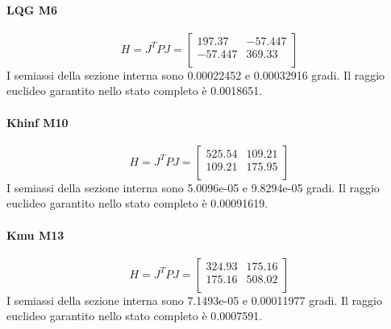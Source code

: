 \paragraph{LQG M6}
\[
H=J^TPJ=\begin{bmatrix}
197.37 & -57.447 \\
-57.447 & 369.33 \\
\end{bmatrix}
\]
I semiassi della sezione interna sono 0.00022452 e 0.00032916 gradi. Il raggio euclideo garantito nello stato completo \`e 0.0018651.
\paragraph{Khinf M10}
\[
H=J^TPJ=\begin{bmatrix}
525.54 & 109.21 \\
109.21 & 175.95 \\
\end{bmatrix}
\]
I semiassi della sezione interna sono 5.0096e-05 e 9.8294e-05 gradi. Il raggio euclideo garantito nello stato completo \`e 0.00091619.
\paragraph{Kmu M13}
\[
H=J^TPJ=\begin{bmatrix}
324.93 & 175.16 \\
175.16 & 508.02 \\
\end{bmatrix}
\]
I semiassi della sezione interna sono 7.1493e-05 e 0.00011977 gradi. Il raggio euclideo garantito nello stato completo \`e 0.0007591.
